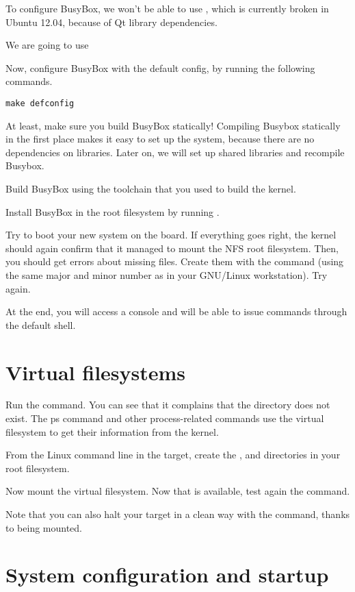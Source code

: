 To configure BusyBox, we won't be able to use ,
which is currently broken in Ubuntu 12.04, because of Qt library
dependencies.

We are going to use 

Now, configure BusyBox with the default config, by running the following commands.
\begin{verbatim}
make defconfig
\end{verbatim}

At least, make sure you build BusyBox statically! Compiling Busybox
statically in the first place makes it easy to set up the system,
because there are no dependencies on libraries. Later on, we will set
up shared libraries and recompile Busybox.

Build BusyBox using the toolchain that you used to build the kernel.

Install BusyBox in the root filesystem by running .

Try to boot your new system on the board. If everything goes right,
the kernel should again confirm that it managed to mount the NFS root
filesystem. Then, you should get errors about missing 
files. Create them with the  command (using the same major
and minor number as in your GNU/Linux workstation). Try again.

At the end, you will access a console and will be able to issue
commands through the default shell.

\section{Virtual filesystems}

Run the  command. You can see that it complains that the
 directory does not exist. The ps command and other
process-related commands use the  virtual filesystem to get
their information from the kernel.

From the Linux command line in the target, create the ,  and
 directories in your root filesystem.

Now mount the  virtual filesystem. Now that  is
available, test again the  command.

Note that you can also halt your target in a clean way with the 
command, thanks to  being mounted.

\section{System configuration and startup}

